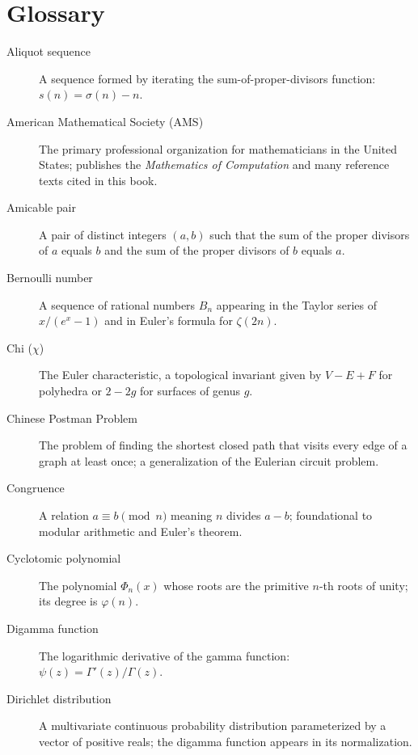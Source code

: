 \chapter*{Glossary}

\begin{description}

\item[Aliquot sequence] A sequence formed by iterating the sum-of-proper-divisors function: $s(n) = \sigma(n) - n$.

\item[American Mathematical Society (AMS)] The primary professional organization for mathematicians in the United States; publishes the \textit{Mathematics of Computation} and many reference texts cited in this book.

\item[Amicable pair] A pair of distinct integers $(a, b)$ such that the sum of the proper divisors of $a$ equals $b$ and the sum of the proper divisors of $b$ equals $a$.

\item[Bernoulli number] A sequence of rational numbers $B_n$ appearing in the Taylor series of $x/(e^x - 1)$ and in Euler's formula for $\zeta(2n)$.

\item[Chi ($\chi$)] The Euler characteristic, a topological invariant given by $V - E + F$ for polyhedra or $2 - 2g$ for surfaces of genus $g$.

\item[Chinese Postman Problem] The problem of finding the shortest closed path that visits every edge of a graph at least once; a generalization of the Eulerian circuit problem.

\item[Congruence] A relation $a \equiv b \pmod{n}$ meaning $n$ divides $a - b$; foundational to modular arithmetic and Euler's theorem.

\item[Cyclotomic polynomial] The polynomial $\Phi_n(x)$ whose roots are the primitive $n$-th roots of unity; its degree is $\varphi(n)$.

\item[Digamma function] The logarithmic derivative of the gamma function: $\psi(z) = \Gamma'(z)/\Gamma(z)$.

\item[Dirichlet distribution] A multivariate continuous probability distribution parameterized by a vector of positive reals; the digamma function appears in its normalization.


\end{description}
